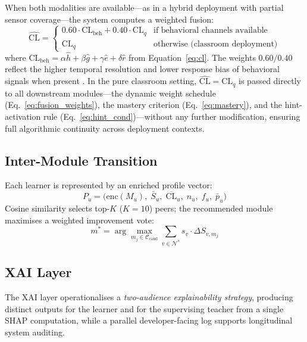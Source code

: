 \documentclass[ASNA,twocolumn]{USG} %
\begin{document}
When both modalities are available---as in a hybrid deployment with
partial sensor coverage---the system computes a weighted fusion:
\begin{equation}
\label{eq:cl_fused}
\widehat{\text{CL}} =
\begin{cases}
0.60\cdot\text{CL}_{\text{beh}} + 0.40\cdot\text{CL}_{q}
  & \text{if behavioral channels available} \\[4pt]
\text{CL}_{q}
  & \text{otherwise (classroom deployment)}
\end{cases}
\end{equation}
where $\text{CL}_{\text{beh}} = \alpha\hat{h}+\beta\hat{g}+
\gamma\hat{e}+\delta\hat{r}$ from Equation~\eqref{eq:cl}.
The weights $0.60/0.40$ reflect the higher temporal resolution and
lower response bias of behavioral signals when present \cite{Paas2003}.
In the pure classroom setting, $\widehat{\text{CL}} = \text{CL}_{q}$
is passed directly to all downstream modules---the dynamic weight
schedule (Eq.~\eqref{eq:fusion_weights}), the mastery criterion
(Eq.~\eqref{eq:mastery}), and the hint-activation rule
(Eq.~\eqref{eq:hint_cond})---without any further modification,
ensuring full algorithmic continuity across deployment contexts.
\subsection{Inter-Module Transition}

Each learner is represented by an enriched profile vector:
\begin{equation}
P_u = \bigl(\text{enc}(M_u),\;\bar{S}_u,\;
            \overline{\text{CL}}_u,\;n_u,\;f_u,\;\bar{p}_u\bigr)
\end{equation}
Cosine similarity selects top-$K$ ($K{=}10$) peers; the recommended
module maximises a weighted improvement vote:
\begin{equation}
m^* = \arg\max_{m_j \in \mathcal{C}_{\text{cand}}}
      \sum_{v \in \mathcal{N}^*} s_v \cdot \Delta S_{v,m_j}
\end{equation}

\subsection{XAI Layer}
\label{sec:xai}

The XAI layer operationalises a \emph{two-audience explainability
strategy}, producing distinct outputs for the learner and for the
supervising teacher from a single SHAP computation, while a
parallel developer-facing log supports longitudinal system auditing.
\end{document}
